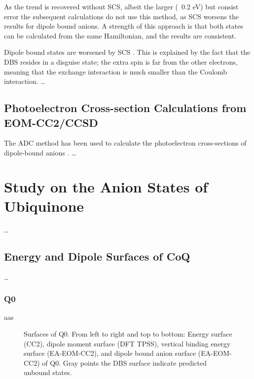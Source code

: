 As the trend is recovered without SCS, albeit the larger (~0.2 eV) but consist error the subsequent calculations do not use this method, as SCS worsens the results for dipole bound anions. A strength of this approach is that both states can be calculated from the same Hamiltonian, and the results are consistent.

Dipole bound states are worsened by SCS \cite{paran2024performance}. This is explained by the fact that the DBS resides in a disguise state; the extra spin is far from the other electrons, meaning that the exchange interaction is much smaller than the Coulomb interaction.
\ldots
\subsection{Photoelectron Cross-section Calculations from EOM-CC2/CCSD}

The ADC method has been used to calculate the photoelectron cross-sections of dipole-bound anions \cite{ruberti2014total}. 
\ldots
\section{Study on the Anion States of Ubiquinone}

\ldots
\subsection{Energy and Dipole Surfaces of CoQ}

\ldots
\subsubsection{Q0}
aas
\begin{figure}[ht!]
  \centering
  \small
  
  \label{fig:Q0_maps}
  \caption[Surfaces of Q0]{Surfaces of Q0. From left to right and top to bottom: Energy surface (CC2), dipole moment surface (DFT TPSS), vertical binding energy surface (EA-EOM-CC2), and dipole bound anion surface (EA-EOM-CC2) of Q0. Gray points the DBS surface indicate predicted unbound states.}
\end{figure}
\iffalse \begin{figure}[ht!]
  \centering
  \begin{minipage}[]{0.49\textwidth}
    \centering
    \small
    
  \end{minipage}%
  \begin{minipage}[]{0.47\textwidth}
    \centering
    \small
    
  \end{minipage}
  \begin{minipage}[]{0.49\textwidth}
    \centering
    \small
    
  \end{minipage}%
  \begin{minipage}[]{0.47\textwidth}
    \centering
    \small
    
  \end{minipage}
  \label{fig:Q0_surf}
  \caption[Surfaces of Q0]{Surfaces of Q0. Left: Energy surface. Right: Dipole moment surface.}
\end{figure} \fi

